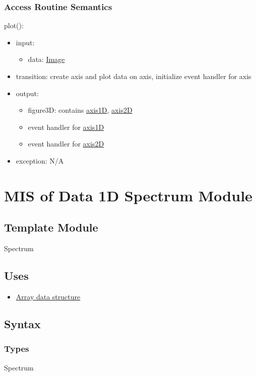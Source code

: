 \documentclass[12pt, titlepage]{article}
\begin{document}
\subsubsection{Access Routine Semantics}

\noindent plot():
\begin{itemize}
    \item input:
    \begin{itemize}
        \item data: \hyperref[Mod:Image]{Image}
    \end{itemize}
    \item transition: create axis and plot data on axis, initialize event handler for axis
    \item output:
    \begin{itemize}
        \item figure3D: contains \hyperref[Mod:Plotting]{axis1D}, \hyperref[Mod:Plotting]{axis2D}
        \item event handler for \hyperref[Mod:Plotting]{axis1D}
        \item event handler for \hyperref[Mod:Plotting]{axis2D}
    \end{itemize}
    \item exception: N/A
\end{itemize}

\section{MIS of Data 1D Spectrum Module} \label{Mod:Spectrum}
\subsection{Template Module}
Spectrum

\subsection{Uses}
\begin{itemize}
\item \hyperref[Mod:Array]{Array data structure}
\end{itemize}

\subsection{Syntax}

\subsubsection{Types}
Spectrum
\end{document}
